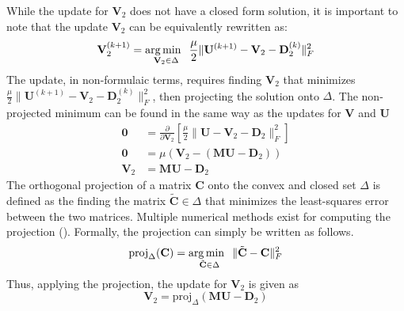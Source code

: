 While the update for $\mathbf{V}_2$ does not have a closed form solution, it is important to note that the update $\mathbf{V}_2$ can be equivalently rewritten as:
$$
\mathbf{V}_2^{(k+1)} = \operatorname*{arg\,min \;\;}_{\mathbf{V}_2 \in \Delta} \frac{\mu}{2} \|\mathbf{U}^{(k+1)} - \mathbf{V}_2 - \mathbf{D}_2^{(k)}\|_F^2 
$$
The update, in non-formulaic terms, requires finding $\mathbf{V}_2$ that minimizes $\frac{\mu}{2} \|\mathbf{U}^{(k+1)} - \mathbf{V}_2 - \mathbf{D}_2^{(k)}\|_F^2$, then projecting the solution onto $\Delta$. 
The non-projected minimum can be found in the same way as the updates for $\mathbf{V}$ and $\mathbf{U}$
\begin{equation*}
  \begin{aligned}
    \mathbf{0} &= \frac{\partial}{\partial \mathbf{V}_2} \left[\frac{\mu}{2} \|\mathbf{U} - \mathbf{V}_2 - \mathbf{D}_2\|_F^2\right]
    \\
    \mathbf{0} &= \mu(\mathbf{V}_2 - (\mathbf{MU} - \mathbf{D}_2))
    \\
    \mathbf{V}_2 &= \mathbf{MU} - \mathbf{D}_2 
  \end{aligned}
\end{equation*}
The orthogonal projection of a matrix $\mathbf{C}$ onto the convex and closed set $\Delta$ is defined as the finding the matrix $\tilde{\mathbf{C}} \in \Delta$ that minimizes the least-squares error between the two matrices. Multiple numerical methods exist for computing the projection (\cite{wang2013projection}). Formally, the projection can simply be written as follows.
\begin{equation*}
  \text{proj}_\Delta(\mathbf{C}) = \operatorname*{arg\,min \;\;}_{\tilde{\mathbf{C}} \in \Delta} \|\tilde{\mathbf{C}} - \mathbf{C}\|_F^2 
\end{equation*}
Thus, applying the projection, the update for $\mathbf{V}_2$ is given as
\begin{equation*}
  \mathbf{V}_2 = \text{proj}_\Delta(\mathbf{MU} - \mathbf{D}_2) 
\end{equation*}


